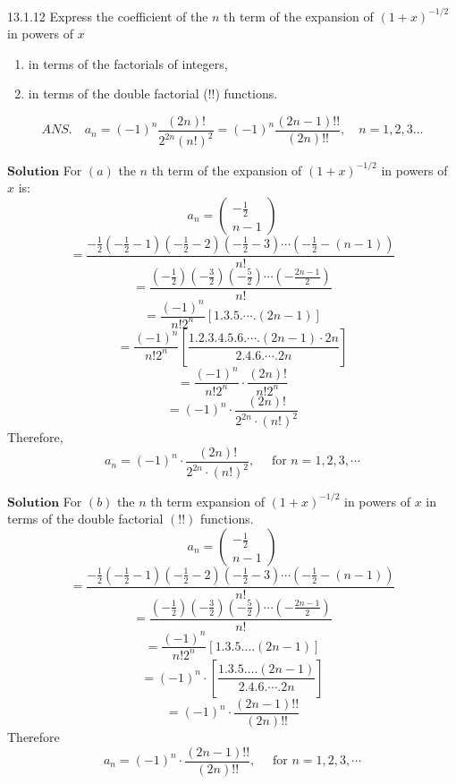 \documentclass{styles/kaobook}
\begin{document}
\begin{greenbox}{13.1.12}
Express the coefficient of the $n$ th term of the expansion of $(1+x)^{-1 / 2}$ in powers of $x$
\begin{enumerate}[$(a)$]
\item in terms of the factorials of integers,
\item in terms of the double factorial
(!!) functions.
\end{enumerate}
$$
A N S . \quad a_{n}=(-1)^{n} \frac{(2 n) !}{2^{2 n}(n !)^{2}}=(-1)^{n} \frac{(2 n-1) ! !}{(2 n) ! !}, \quad n=1,2,3 \ldots
$$
\end{greenbox}

$\boxed{\textbf{Solution}}$ For $(a)$ the $n$ th term of the expansion of $(1+x)^{-1 / 2}$ in powers of $x$ is:
$$
a_{n}=\left(\begin{array}{c}
-\frac{1}{2} \\
n-1
\end{array}\right)
$$
$$
=\frac{-\frac{1}{2}\left(-\frac{1}{2}-1\right)\left(-\frac{1}{2}-2\right)\left(-\frac{1}{2}-3\right) \cdots\left(-\frac{1}{2}-(n-1)\right)}{n !}
$$
$$
=\frac{\left(-\frac{1}{2}\right)\left(-\frac{3}{2}\right)\left(-\frac{5}{2}\right) \cdots\left(-\frac{2 n-1}{2}\right)}{n !}
$$
$$
=\frac{(-1)^{n}}{n ! 2^{n}}[1.3 .5 . \cdots .(2 n-1)]
$$
$$
=\frac{(-1)^{n}}{n ! 2^{n}}\left[\frac{1.2 .3 .4 .5 .6 . \cdots .(2 n-1) \cdot 2 n}{2.4 .6 . \cdots .2 n}\right]
$$
$$=\frac{(-1)^{n}}{n ! 2^{n}} \cdot \frac{(2 n) !}{n ! 2^{n}}$$
$$=(-1)^{n} \cdot \frac{(2 n) !}{2^{2 n} \cdot(n !)^{2}}$$
Therefore, 
$$
a_{n}=(-1)^{n} \cdot \frac{(2 n) !}{2^{2 n} \cdot(n !)^{2}}, \quad \text { for } n=1,2,3, \cdots
$$

$\boxed{\textbf{Solution}}$ For $(b)$ the $n$ th term expansion of $(1+x)^{-1 / 2}$ in powers of $x$ in terms of the double factorial $(!!)$ functions.
$$
a_{n}=\left(\begin{array}{c}
-\frac{1}{2} \\
n-1
\end{array}\right)
$$
$$
=\frac{-\frac{1}{2}\left(-\frac{1}{2}-1\right)\left(-\frac{1}{2}-2\right)\left(-\frac{1}{2}-3\right) \cdots\left(-\frac{1}{2}-(n-1)\right)}{n !}
$$
$$
=\frac{\left(-\frac{1}{2}\right)\left(-\frac{3}{2}\right)\left(-\frac{5}{2}\right) \cdots\left(-\frac{2 n-1}{2}\right)}{n !}
$$
$$=\frac{(-1)^{n}}{n ! 2^{n}}[1.3 .5 \ldots .(2 n-1)]$$
$$=(-1)^{n} \cdot\left[\frac{1.3 .5 \ldots .(2 n-1)}{2.4 .6 . \cdots .2 n}\right]$$
$$=(-1)^{n} \cdot \frac{(2 n-1) ! !}{(2 n) ! !}$$
Therefore
$$
a_{n}=(-1)^{n} \cdot \frac{(2 n-1) ! !}{(2 n) ! !}, \quad \text { for } n=1,2,3, \cdots
$$
\end{document}
